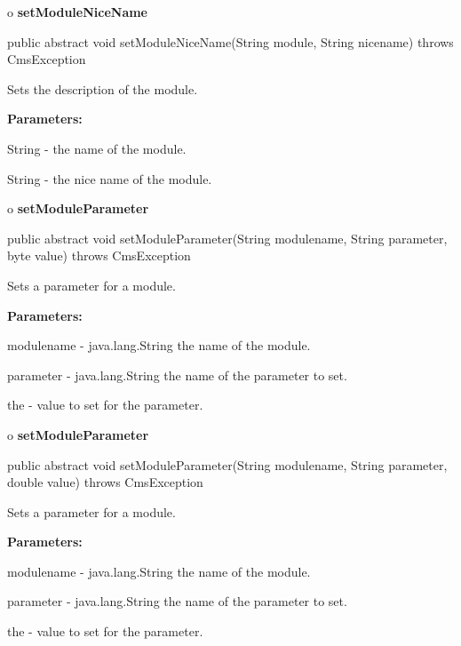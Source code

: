 o {\bf setModuleNiceName} 

\begin{PRE}
 public abstract void setModuleNiceName(String module,
                                        String nicename) throws CmsException
\end{PRE}

\begin{description}
\htmlDD Sets the description of the module. 

\begin{description}
\item {\bf Parameters:}  

String - the name of the module.  

String - the nice name of the module.  
\end{description}

\end{description}

o {\bf setModuleParameter} 

\begin{PRE}
 public abstract void setModuleParameter(String modulename,
                                         String parameter,
                                         byte value) throws CmsException
\end{PRE}

\begin{description}
\htmlDD Sets a parameter for a module. 

\begin{description}
\item {\bf Parameters:}  

modulename - java.lang.String the name of the module.  

parameter - java.lang.String the name of the parameter to set.  

the - value to set for the parameter.  
\end{description}

\end{description}

o {\bf setModuleParameter} 

\begin{PRE}
 public abstract void setModuleParameter(String modulename,
                                         String parameter,
                                         double value) throws CmsException
\end{PRE}

\begin{description}
\htmlDD Sets a parameter for a module. 

\begin{description}
\item {\bf Parameters:}  

modulename - java.lang.String the name of the module.  

parameter - java.lang.String the name of the parameter to set.  

the - value to set for the parameter.  
\end{description}

\end{description}

